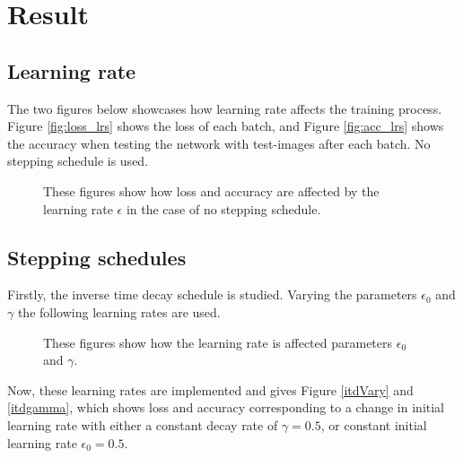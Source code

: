 \documentclass{article}
\begin{document}
\section{Result}
\subsection{Learning rate}\label{sec: lr res}

\noindent The two figures below showcases how learning rate affects the training process. Figure \ref{fig:loss_lrs} shows the loss of each batch, and Figure \ref{fig:acc_lrs} shows the accuracy when testing the network with test-images after each batch. No stepping schedule is used.

\begin{figure}[H]
  \centering
  \hfill
  \caption{These figures show how loss and accuracy are affected by the learning rate $\epsilon$ in the case of no stepping schedule.}
\end{figure}


\subsection{Stepping schedules}
Firstly, the inverse time decay schedule is studied. Varying the parameters $\epsilon_0$ and $\gamma$ the following learning rates are used.
\begin{figure}[H]
  \centering
  \hfill
  \caption{These figures show how the learning rate is affected parameters $\epsilon_0$ and $\gamma$.}
  \label{StepSchedNoiseB}
\end{figure}

\noindent Now, these learning rates are implemented and gives Figure \ref{itdVary} and \ref{itdgamma}, which shows loss and accuracy corresponding to a change in initial learning rate with either a constant decay rate of $\gamma = 0.5$, or constant initial learning rate $\epsilon_0 = 0.5$.
\end{document}
